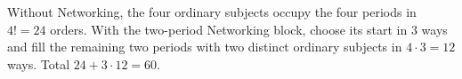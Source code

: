 Without Networking, the four ordinary subjects occupy the four periods in $4!=24$ orders. With the two-period Networking block, choose its start in 3 ways and fill the remaining two periods with two distinct ordinary subjects in $4\cdot3=12$ ways. Total $24+3\cdot12=\boxed{60}$.
